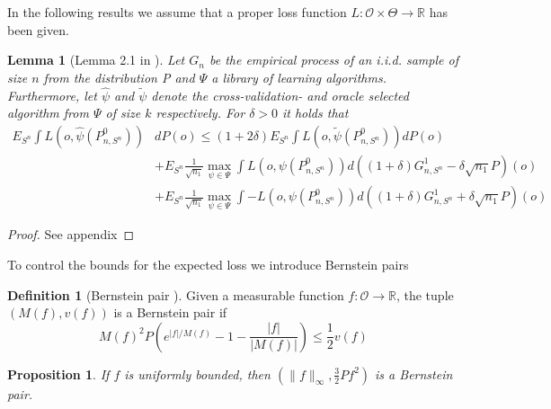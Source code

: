 \documentclass[11pt, a4paper]{article}
\newcommand\norm[1]{\lVert#1\rVert}
\newtheorem{proposition}[theorem]{Proposition}
\newtheorem{lemma}[theorem]{Lemma}
\theoremstyle{definition}
\newtheorem{definition}[theorem]{Definition}
\theoremstyle{remark}
\newcommand{\ml}{k}
\newcommand{\la}{\psi}
\newcommand{\Sn}{S^n}
\newcommand{\lib}{\Psi}
\begin{document}
In the following results we assume that a proper loss function $ L: \mathcal{O} \times \Theta \to \mathbb{R} $ has been given.  
\begin{lemma}[Lemma 2.1 in \parencite{vaart06}] \label{finitesampledecomp}
    Let $ G_{n} $ be the empirical process of an i.i.d. sample of size $ n $ from the distribution P and $ \lib$ a library of learning algorithms. Furthermore, let $ \hat{\la}  $ and $ \tilde{\la} $ denote the cross-validation- and oracle selected algorithm from $ \lib $ of size $ \ml $ respectively. For $ \delta > 0 $ it holds that
   \begin{align*}
       E_{\Sn} \int L(o, \hat{\la}(P_{n, \Sn}^{0})) &dP(o) \leq (1 + 2 \delta) E_{\Sn} \int L(o, \tilde{\la}(P_{n, \Sn}^{0})) d P(o) \\ 
                                                                &+E_{\Sn} \frac{1}{\sqrt{n_1} } \max_{\la \in \lib} \int L(o, \la(P_{n, \Sn}^{0})) d ((1 + \delta) G_{n,\Sn}^{1} - \delta \sqrt{n_1} P)(o)  \\
                                                                &+E_{\Sn} \frac{1}{\sqrt{n_1} } \max_{\la \in \lib} \int-L(o, \la(P_{n, \Sn}^{0})) d ((1 + \delta) G_{n,\Sn}^{1} + \delta \sqrt{n_1} P)(o)  
   \end{align*}
\end{lemma}
\begin{proof}
    See appendix
\end{proof}
To control the bounds for the expected loss we introduce Bernstein pairs 
\begin{definition}[Bernstein pair \parencite{vaart06}]
    Given a measurable function $ f: \mathcal{O} \to \mathbb{R} $, the tuple $ (M(f) , v(f)) $ is a Bernstein pair if 
    \begin{equation} \label{bernstein}
        M(f)^2 P\left( e^{|f|/M(f)} -1 - \frac{|f|}{|M(f)|}\right) \leq \frac{1}{2}v(f) 
    \end{equation}
\end{definition}
\begin{proposition} \label{unifbernstein}
    If $ f $ is uniformly bounded, then $ (\norm{f}_{\infty}, \frac{3}{2} Pf^2 ) $ is a Bernstein pair. 
\end{proposition}
\end{document}
